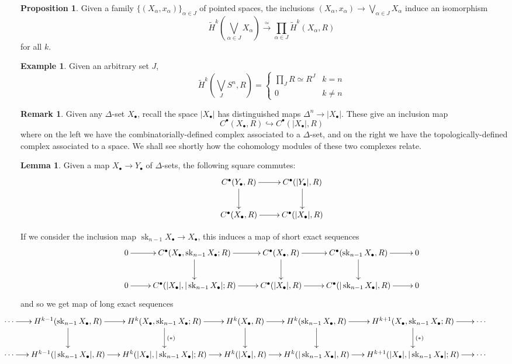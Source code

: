 \documentclass{tufte-handout}
\def\into {\hookrightarrow}
\newcommand{\lecturenum}[1]{\marginnote{\color{red}Lecture #1}}
\DeclareMathOperator{\sk}{sk}
\theoremstyle{definition}
\newtheorem{prop}{Proposition}
\newtheorem{lemma}{Lemma}
\newtheorem{example}{Example}
\newtheorem*{rem}{Remark}
\begin{document}
\begin{prop}
Given a family $\{(X_\alpha,x_\alpha)\}_{\alpha\in J}$ of pointed spaces, the inclusions $(X_\alpha,x_\alpha) \to \bigvee_{\alpha\in J} X_\alpha$ induce an isomorphism
\[
	\widetilde{H}^k(\bigvee_{\alpha\in J} X_\alpha) \xrightarrow{\simeq} \prod_{\alpha \in J} \widetilde{H}^k(X_\alpha,R)
\]
for all $k$.
\end{prop}

\begin{example}
Given an arbitrary set $J$,
\[
	\widetilde{H}^k(\bigvee_J S^n,R) = \begin{cases}
	\prod_J R \simeq R^J & k=n\\
	0 & k\neq n
	\end{cases}
\]
\end{example}

\begin{rem}
Given any $\Delta$-set $X_\bullet$, recall the space $|X_\bullet|$ has distinguished maps $\Delta^n \to |X_\bullet|$. These give an inclusion map
\[
	C^\bullet(X_\bullet,R) \into C^\bullet(|X_\bullet|,R)
\]
where on the left we have the combinatorially-defined complex associated to a $\Delta$-set, and 
on the right we have the topologically-defined complex associated to a space. We shall see 
shortly how the cohomology modules of these two complexes relate.
\end{rem}

\lecturenum{29}
\begin{lemma}
Given a map $X_\bullet \to Y_\bullet$ of $\Delta$-sets, the following square commutes:
\[
	\xymatrix{
	C^\bullet(Y_\bullet,R) \ar[d] \ar[r] & C^\bullet(|Y_\bullet|,R) \ar[d] \\
	C^\bullet(X_\bullet,R) \ar[r] & C^\bullet(|X_\bullet|,R) 
	}
\]
\end{lemma}

If we consider the inclusion map $\sk_{n-1} X_\bullet \to X_\bullet$, this induces a map of short exact
sequences
\[
\xymatrix{
0 \ar[r] & C^\bullet(X_\bullet,\sk_{n-1}X_\bullet;R) \ar[r] \ar[d]  & C^\bullet(X_\bullet,R) \ar[r] \ar[d]& C^\bullet(\sk_{n-1}X_\bullet,R) \ar[r] \ar[d]& 0\\
0 \ar[r] & C^\bullet(|X_\bullet|,|\sk_{n-1}X_\bullet|;R) \ar[r]  & C^\bullet(|X_\bullet|,R) \ar[r]& C^\bullet(|\sk_{n-1} X_\bullet|,R) \ar[r] & 0
 }
\]
and so we get map of long exact sequences
\[\hspace{-2.3cm}
\xymatrix@C1.5em{
\cdots \ar[r]&H^{k-1}(\sk_{n-1}X_\bullet,R) \ar[r] \ar[d] & H^k(X_\bullet,\sk_{n-1}X_\bullet;R) \ar[r] \ar[d]^{(*)} &H^k(X_\bullet,R) \ar[r] \ar[d] & H^k(\sk_{n-1}X_\bullet,R) \ar[r] \ar[d] &H^{k+1}(X_\bullet,\sk_{n-1}X_\bullet;R) \ar[r] \ar[d]^{(*)} & \cdots\\
\cdots \ar[r]&H^{k-1}(|\sk_{n-1}X_\bullet|,R) \ar[r] & H^k(|X_\bullet|,|\sk_{n-1}X_\bullet|;R) \ar[r] &H^k(|X_\bullet|,R) \ar[r]  & H^k(|\sk_{n-1}X_\bullet|,R) \ar[r] & H^{k+1}(|X_\bullet|,|\sk_{n-1}X_\bullet|;R) \ar[r] & \cdots\\
}\]
\end{document}
